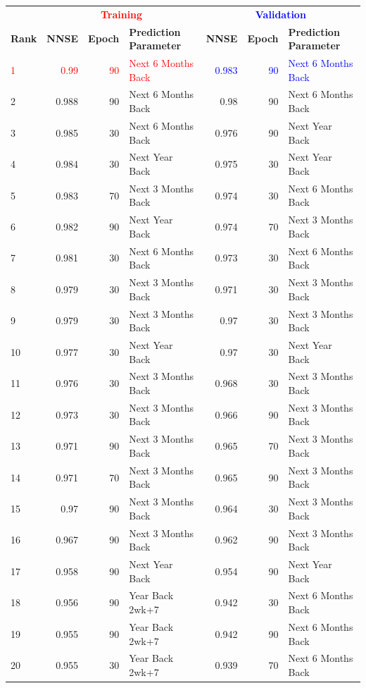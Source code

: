 \documentclass[utf8]{FrontiersinVancouver} %
\begin{document}
\begin{table}[htb]
      \renewcommand{\arraystretch}{1.2}
      \begin{center}
        {\footnotesize
    \begin{tabular}{|l||r|r|l|r|r|l|}
      \hline
     &   \multicolumn{3}{c|}{\bf \textcolor{red}{Training}}  & \multicolumn{3}{c|}{\bf \textcolor{blue}{Validation}}  \\
    {\bf Rank} &  {\bf NNSE} &  {\bf Epoch} & {\bf Prediction Parameter} & {\bf NNSE} &  {\bf Epoch} & {\bf Prediction Parameter}\\
    \hline
    \hline
        \textcolor{red}{1}  &  \textcolor{red}{0.99} &     \textcolor{red}{90} &  \textcolor{red}{Next 6 Months Back} &  \textcolor{blue}{0.983} &     \textcolor{blue}{90} &  \textcolor{blue}{Next 6 Months Back} \\
    2  &  0.988 &     90 &  Next 6 Months Back &  0.98 &     90 &  Next 6 Months Back \\
3  &  0.985 &     30 &  Next 6 Months Back &  0.976 &     90 &      Next Year Back \\
4  &  0.984 &     30 &      Next Year Back &  0.975 &     30 &      Next Year Back \\
5  &  0.983 &     70 &  Next 3 Months Back &  0.974 &     30 &  Next 6 Months Back \\
6  &  0.982 &     90 &      Next Year Back &  0.974 &     70 &  Next 3 Months Back \\
7  &  0.981 &     30 &  Next 6 Months Back &  0.973 &     30 &  Next 6 Months Back \\
8  &  0.979 &     30 &  Next 3 Months Back &  0.971 &     30 &  Next 3 Months Back \\
9  &  0.979 &     30 &  Next 3 Months Back &  0.97 &     30 &  Next 3 Months Back \\
10  &  0.977 &     30 &      Next Year Back &  0.97 &     30 &      Next Year Back \\
11  &  0.976 &     30 &  Next 3 Months Back &  0.968 &     30 &  Next 3 Months Back \\
12  &  0.973 &     30 &  Next 3 Months Back &  0.966 &     90 &  Next 3 Months Back \\
13  &  0.971 &     90 &  Next 3 Months Back &  0.965 &     70 &  Next 3 Months Back \\
14  &  0.971 &     70 &  Next 3 Months Back &  0.965 &     90 &  Next 3 Months Back \\
15  &  0.97 &     90 &  Next 3 Months Back &  0.964 &     30 &  Next 3 Months Back \\
16  &  0.967 &     90 &  Next 3 Months Back &  0.962 &     90 &  Next 3 Months Back \\
17  &  0.958 &     90 &      Next Year Back &  0.954 &     90 &      Next Year Back \\
18  &  0.956 &     90 &     Year Back 2wk+7 &  0.942 &     30 &  Next 6 Months Back \\
19  &  0.955 &     90 &     Year Back 2wk+7 &  0.942 &     90 &  Next 6 Months Back \\
20  &  0.955 &     30 &     Year Back 2wk+7 &  0.939 &     70 &  Next 6 Months Back \\


\end{tabular}}
\end{center}
\end{table}
\end{document}

